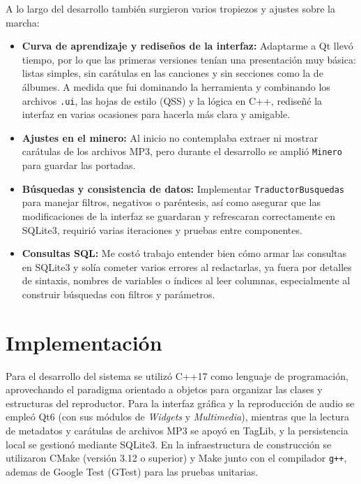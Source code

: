 \documentclass[11pt,a4paper]{article}
\begin{document}
    A lo largo del desarrollo también surgieron varios tropiezos y ajustes sobre la marcha:
    \begin{itemize}
    \item \textbf{Curva de aprendizaje y rediseños de la interfaz:} Adaptarme a Qt llevó tiempo, por lo que las primeras versiones tenían una presentación muy básica: listas simples, sin carátulas en las canciones y sin secciones como la de álbumes. A medida que fui dominando la herramienta y combinando los archivos \texttt{.ui}, las hojas de estilo (QSS) y la lógica en C++, rediseñé la interfaz en varias ocasiones para hacerla más clara y amigable.
    
    \item \textbf{Ajustes en el minero:} Al inicio no contemplaba extraer ni mostrar carátulas de los archivos MP3, pero durante el desarrollo se amplió \texttt{Minero} para guardar las portadas.
    
    \item \textbf{Búsquedas y consistencia de datos:} Implementar \texttt{TraductorBusquedas} para manejar filtros, negativos o paréntesis, así como asegurar que las modificaciones de la interfaz se guardaran y refrescaran correctamente en SQLite3, requirió varias iteraciones y pruebas entre componentes.
    \item \textbf{Consultas SQL:} Me costó trabajo entender bien cómo armar las consultas en SQLite3 y solía cometer varios errores al redactarlas, ya fuera por detalles de sintaxis, nombres de variables o índices al leer columnas, especialmente al construir búsquedas con filtros y parámetros.
    \end{itemize}
    
    \section{Implementación}
    
    Para el desarrollo del sistema se utilizó C++17 como lenguaje de programación, aprovechando el paradigma orientado a objetos para organizar las clases y estructuras del reproductor. Para la interfaz gráfica y la reproducción de audio se empleó Qt6 (con sus módulos de \textit{Widgets} y \textit{Multimedia}), mientras que la lectura de metadatos y carátulas de archivos MP3 se apoyó en TagLib, y la persistencia local se gestionó mediante SQLite3. En la infraestructura de construcción se utilizaron CMake (versión 3.12 o superior) y Make junto con el compilador \texttt{g++}, ademas de Google Test (GTest) para las pruebas unitarias.
    
\end{document}
